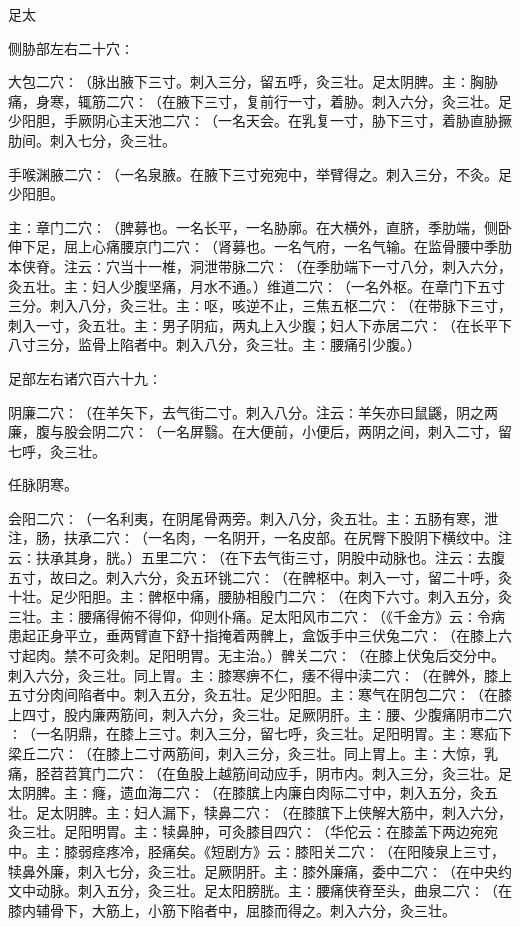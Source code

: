 \documentclass[a4paper,12pt,UTF8,twoside]{ctexbook}
\begin{document}
足太

侧胁部左右二十穴∶

大包二穴∶（脉出腋下三寸。刺入三分，留五呼，灸三壮。足太阴脾。主∶胸胁痛，身寒，辄筋二穴∶（在腋下三寸，复前行一寸，着胁。刺入六分，灸三壮。足少阳胆，手厥阴心主天池二穴∶（一名天会。在乳复一寸，胁下三寸，着胁直胁撅肋间。刺入七分，灸三壮。

手喉渊腋二穴∶（一名泉腋。在腋下三寸宛宛中，举臂得之。刺入三分，不灸。足少阳胆。

主∶章门二穴∶（脾募也。一名长平，一名胁廓。在大横外，直脐，季肋端，侧卧伸下足，屈上心痛腰京门二穴∶（肾募也。一名气府，一名气输。在监骨腰中季肋本侠脊。注云∶穴当十一椎，洞泄带脉二穴∶（在季肋端下一寸八分，刺入六分，灸五壮。主∶妇人少腹坚痛，月水不通。）维道二穴∶（一名外枢。在章门下五寸三分。刺入八分，灸三壮。主∶呕，咳逆不止，三焦五枢二穴∶（在带脉下三寸，刺入一寸，灸五壮。主∶男子阴疝，两丸上入少腹；妇人下赤居二穴∶（在长平下八寸三分，监骨上陷者中。刺入八分，灸三壮。主∶腰痛引少腹。）

足部左右诸穴百六十九∶

阴廉二穴∶（在羊矢下，去气街二寸。刺入八分。注云∶羊矢亦曰鼠鼷，阴之两廉，腹与股会阴二穴∶（一名屏翳。在大便前，小便后，两阴之间，刺入二寸，留七呼，灸三壮。

任脉阴寒。

会阳二穴∶（一名利夷，在阴尾骨两旁。刺入八分，灸五壮。主∶五肠有寒，泄注，肠，扶承二穴∶（一名肉，一名阴开，一名皮部。在尻臀下股阴下横纹中。注云∶扶承其身，胱。）五里二穴∶（在下去气街三寸，阴股中动脉也。注云∶去腹五寸，故曰之。刺入六分，灸五环铫二穴∶（在髀枢中。刺入一寸，留二十呼，灸十壮。足少阳胆。主∶髀枢中痛，腰胁相殷门二穴∶（在肉下六寸。刺入五分，灸三壮。主∶腰痛得俯不得仰，仰则仆痛。足太阳风市二穴∶（《千金方》云∶令病患起正身平立，垂两臂直下舒十指掩着两髀上，盒饭手中三伏兔二穴∶（在膝上六寸起肉。禁不可灸刺。足阳明胃。无主治。）髀关二穴∶（在膝上伏兔后交分中。刺入六分，灸三壮。同上胃。主∶膝寒痹不仁，痿不得中渎二穴∶（在髀外，膝上五寸分肉间陷者中。刺入五分，灸五壮。足少阳胆。主∶寒气在阴包二穴∶（在膝上四寸，股内廉两筋间，刺入六分，灸三壮。足厥阴肝。主∶腰、少腹痛阴市二穴∶（一名阴鼎，在膝上三寸。刺入三分，留七呼，灸三壮。足阳明胃。主∶寒疝下梁丘二穴∶（在膝上二寸两筋间，刺入三分，灸三壮。同上胃上。主∶大惊，乳痛，胫苕苕箕门二穴∶（在鱼股上越筋间动应手，阴市内。刺入三分，灸三壮。足太阴脾。主∶癃，遗血海二穴∶（在膝膑上内廉白肉际二寸中，刺入五分，灸五壮。足太阴脾。主∶妇人漏下，犊鼻二穴∶（在膝膑下上侠解大筋中，刺入六分，灸三壮。足阳明胃。主∶犊鼻肿，可灸膝目四穴∶（华佗云∶在膝盖下两边宛宛中。主∶膝弱痉疼冷，胫痛矣。《短剧方》云∶膝阳关二穴∶（在阳陵泉上三寸，犊鼻外廉，刺入七分，灸三壮。足厥阴肝。主∶膝外廉痛，委中二穴∶（在中央约文中动脉。刺入五分，灸三壮。足太阳膀胱。主∶腰痛侠脊至头，曲泉二穴∶（在膝内辅骨下，大筋上，小筋下陷者中，屈膝而得之。刺入六分，灸三壮。
\end{document}
